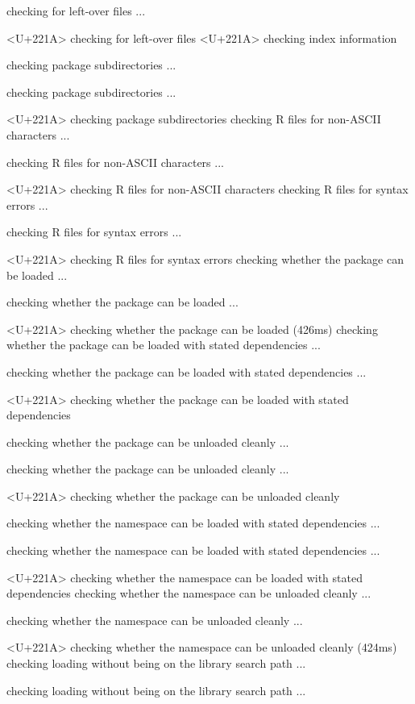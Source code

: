 \documentclass[a4paper,12pt]{article}\usepackage[]{graphicx}\usepackage[]{color}
\begin{document}
\begin{Schunk}
\begin{Soutput}
   checking for left-over files ... 
  
<U+221A>  checking for left-over files
<U+221A>  checking index information

  
   checking package subdirectories ...
  
   checking package subdirectories ... 
  
<U+221A>  checking package subdirectories
   checking R files for non-ASCII characters ...
  
   checking R files for non-ASCII characters ... 
  
<U+221A>  checking R files for non-ASCII characters
   checking R files for syntax errors ...
  
   checking R files for syntax errors ... 
  
<U+221A>  checking R files for syntax errors
   checking whether the package can be loaded ...
  
   checking whether the package can be loaded ... 
  
<U+221A>  checking whether the package can be loaded (426ms)
   checking whether the package can be loaded with stated dependencies ...
  
   checking whether the package can be loaded with stated dependencies ... 
  
<U+221A>  checking whether the package can be loaded with stated dependencies

  
   checking whether the package can be unloaded cleanly ...
  
   checking whether the package can be unloaded cleanly ... 
  
<U+221A>  checking whether the package can be unloaded cleanly

  
   checking whether the namespace can be loaded with stated dependencies ...
  
   checking whether the namespace can be loaded with stated dependencies ... 
  
<U+221A>  checking whether the namespace can be loaded with stated dependencies
   checking whether the namespace can be unloaded cleanly ...
  
   checking whether the namespace can be unloaded cleanly ... 
  
<U+221A>  checking whether the namespace can be unloaded cleanly (424ms)
   checking loading without being on the library search path ...
  
   checking loading without being on the library search path ... 
  

\end{Soutput}
\end{Schunk}
\end{document}
